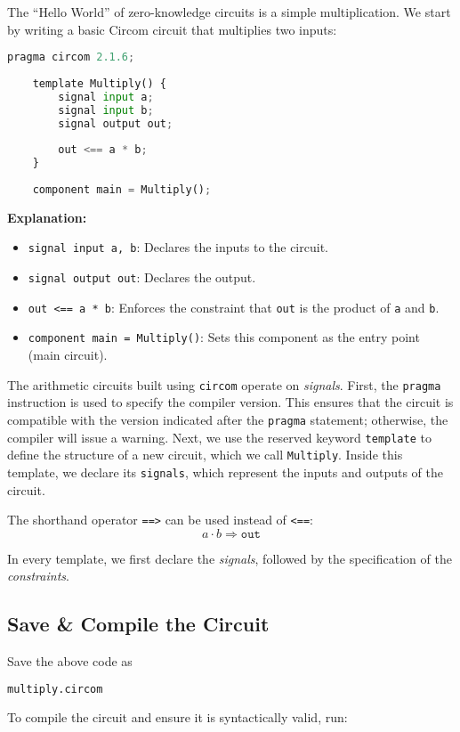 \documentclass{article}
\begin{document}
The ``Hello World'' of zero-knowledge circuits is a simple multiplication. We start by writing a basic Circom circuit that multiplies two inputs:

\begin{lstlisting}[language=Python,caption={multiply.circom}]
	pragma circom 2.1.6;
	
	template Multiply() {
		signal input a;
		signal input b;
		signal output out;
		
		out <== a * b;
	}
	
	component main = Multiply();
\end{lstlisting}

\textbf{Explanation:}
\begin{itemize}
	\item \texttt{signal input a, b}: Declares the inputs to the circuit.
	\item \texttt{signal output out}: Declares the output.
	\item \texttt{out <== a * b}: Enforces the constraint that \texttt{out} is the product of \texttt{a} and \texttt{b}.
	\item \texttt{component main = Multiply()}: Sets this component as the entry point (main circuit).
\end{itemize}
The arithmetic circuits built using \texttt{circom} operate on \textit{signals}. First, the \texttt{pragma} instruction is used to specify the compiler version. This ensures that the circuit is compatible with the version indicated after the \texttt{pragma} statement; otherwise, the compiler will issue a warning. Next, we use the reserved keyword \texttt{template} to define the structure of a new circuit, which we call \texttt{Multiply}. Inside this template, we declare its \texttt{signals}, which represent the inputs and outputs of the circuit.


The shorthand operator \texttt{==>} can be used instead of \texttt{<==}:
\[
a \cdot b \Rightarrow \texttt{out}
\]

In every template, we first declare the \textit{signals}, followed by the specification of the \textit{constraints}.

\subsection{Save \& Compile the Circuit}
Save the above code as 
\begin{lstlisting}[language=bash]
multiply.circom
\end{lstlisting}To compile the circuit and ensure it is syntactically valid, run:
\end{document}
